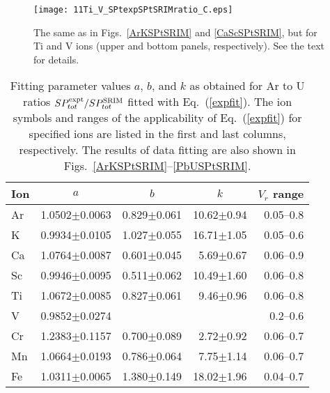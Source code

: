 \documentclass[aps,pra,twocolumn,amsmath,amssymb,floatfix]{revtex4-2}
\begin{document}
\begin{figure}[!h]   %
\begin{center}
\texttt{[image: 11Ti\_V\_SPtexpSPtSRIMratio\_C.eps]}
\caption{\label{TiVSPtSRIM} The same as in Figs.~\ref{ArKSPtSRIM} and \ref{CaScSPtSRIM}, but for Ti and V ions (upper and bottom panels, respectively). See the text for details.}
\end{center}
\end{figure}

\begin{table}[!h]  %
\vspace*{-1.5mm}
\caption{\label{abkparam} Fitting parameter values $a$, $b$, and $k$ as obtained for Ar to U ratios $SP_{tot}^{\rm expt}/SP_{tot}^{\rm SRIM}$ fitted with Eq.~(\ref{expfit}). The ion symbols and ranges of the applicability of Eq.~(\ref{expfit}) for specified ions are listed in the first and last columns, respectively. The results of data fitting are also shown in Figs.~\ref{ArKSPtSRIM}--\ref{PbUSPtSRIM}.
}
\begin{ruledtabular}
\begin{tabular}{lccrr}
Ion                                   &                    $a$               &                $b$        & \multicolumn{1}{c}{$k$} &$V_{r}$ range \\
\hline
  Ar\footnotemark[1] & 1.0502$\pm$0.0063 & 0.829$\pm$0.061 & 10.62$\pm$0.94 &  0.05--0.8   \\
   K\footnotemark[2]  & 0.9934$\pm$0.0105 & 1.027$\pm$0.055 & 16.71$\pm$1.05 &  0.05--0.6   \\
 Ca\footnotemark[3]  & 1.0764$\pm$0.0087 & 0.601$\pm$0.045 &   5.69$\pm$0.67 &   0.06--0.9   \\
  Sc\footnotemark[2]  & 0.9946$\pm$0.0095 & 0.511$\pm$0.062 & 10.49$\pm$1.60 &   0.06--0.8  \\
  Ti                                     & 1.0672$\pm$0.0085 & 0.827$\pm$0.061 &   9.46$\pm$0.96 &  0.06--0.8    \\
  V                                      & 0.9852$\pm$0.0274 &                                     &                                   &    0.2--0.6    \\
  Cr\footnotemark[2]  & 1.2383$\pm$0.1157 & 0.700$\pm$0.089 &   2.72$\pm$0.92 &    0.06--0.7  \\
 Mn\footnotemark[2] & 1.0664$\pm$0.0193 & 0.786$\pm$0.064 &   7.75$\pm$1.14 &    0.06--0.7  \\
  Fe                                     & 1.0311$\pm$0.0065 & 1.380$\pm$0.149 & 18.02$\pm$1.96 &   0.04--0.7  \\

\end{tabular}
\end{ruledtabular}
\end{table}
\end{document}
